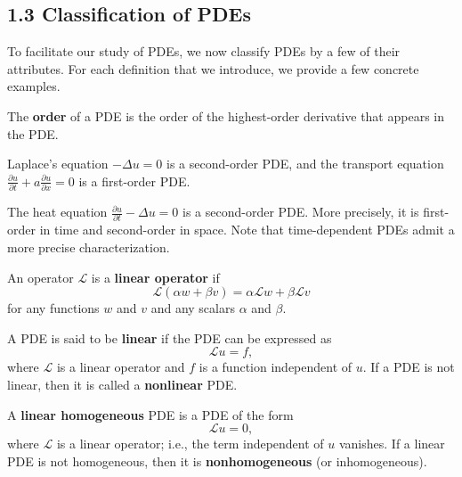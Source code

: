 \subsection{1.3 Classification of PDEs}
To facilitate our study of PDEs, we now classify PDEs by a few of their attributes. For each definition that we introduce, we provide a few concrete examples.

\begin{definition}
    The \textbf{order} of a PDE is the order of the highest-order derivative that appears in the PDE.
\end{definition}

\begin{example}[][1.3]
    Laplace's equation $-\Delta u = 0$ is a second-order PDE, and the transport equation $\frac{\partial u}{\partial t} + a \frac{\partial u}{\partial x} = 0$ is a first-order PDE.
\end{example}

\begin{example}[][1.4]
    The heat equation $\frac{\partial u}{\partial t} - \Delta u = 0$ is a second-order PDE. More precisely, it is first-order in time and second-order in space. Note that time-dependent PDEs admit a more precise characterization.
\end{example}

\begin{definition}
    An operator $\mathcal{L}$ is a \textbf{linear operator} if
    \[\mathcal{L}(\alpha w + \beta v) = \alpha \mathcal{L} w + \beta \mathcal{L} v\]
    for any functions $w$ and $v$ and any scalars $\alpha$ and $\beta$.
\end{definition}

\begin{definition}
    A PDE is said to be \textbf{linear} if the PDE can be expressed as
    \[\mathcal{L} u = f,\]
    where $\mathcal{L}$ is a linear operator and $f$ is a function independent of $u$. If a PDE is not linear, then it is called a \textbf{nonlinear} PDE.
\end{definition}

\begin{definition}
    A \textbf{linear homogeneous} PDE is a PDE of the form
    \[\mathcal{L} u = 0,\]
    where $\mathcal{L}$ is a linear operator; i.e., the term independent of $u$ vanishes. If a linear PDE is not homogeneous, then it is \textbf{nonhomogeneous} (or inhomogeneous).
\end{definition}

